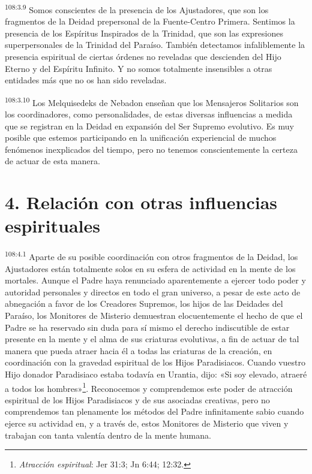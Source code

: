 \par
\textsuperscript{108:3.9} Somos conscientes de la presencia de los Ajustadores, que son los fragmentos de la Deidad prepersonal de la Fuente-Centro Primera. Sentimos la presencia de los Espíritus Inspirados de la Trinidad, que son las expresiones superpersonales de la Trinidad del Paraíso. También detectamos infaliblemente la presencia espiritual de ciertas órdenes no reveladas que descienden del Hijo Eterno y del Espíritu Infinito. Y no somos totalmente insensibles a otras entidades más que no os han sido reveladas.

\par
\textsuperscript{108:3.10} Los Melquisedeks de Nebadon enseñan que los Mensajeros Solitarios son los coordinadores, como personalidades, de estas diversas influencias a medida que se registran en la Deidad en expansión del Ser Supremo evolutivo. Es muy posible que estemos participando en la unificación experiencial de muchos fenómenos inexplicados del tiempo, pero no tenemos conscientemente la certeza de actuar de esta manera.

\section*{4. Relación con otras influencias espirituales}
\par
\textsuperscript{108:4.1} Aparte de su posible coordinación con otros fragmentos de la Deidad, los Ajustadores están totalmente solos en su esfera de actividad en la mente de los mortales. Aunque el Padre haya renunciado aparentemente a ejercer todo poder y autoridad personales y directos en todo el gran universo, a pesar de este acto de abnegación a favor de los Creadores Supremos, los hijos de las Deidades del Paraíso, los Monitores de Misterio demuestran elocuentemente el hecho de que el Padre se ha reservado sin duda para sí mismo el derecho indiscutible de estar presente en la mente y el alma de sus criaturas evolutivas, a fin de actuar de tal manera que pueda atraer hacia él a todas las criaturas de la creación, en coordinación con la gravedad espiritual de los Hijos Paradisiacos. Cuando vuestro Hijo donador Paradisiaco estaba todavía en Urantia, dijo: «Si soy elevado, atraeré a todos los hombres»\footnote{\textit{Atracción espiritual}: Jer 31:3; Jn 6:44; 12:32.}. Reconocemos y comprendemos este poder de atracción espiritual de los Hijos Paradisiacos y de sus asociadas creativas, pero no comprendemos tan plenamente los métodos del Padre infinitamente sabio cuando ejerce su actividad en, y a través de, estos Monitores de Misterio que viven y trabajan con tanta valentía dentro de la mente humana.

